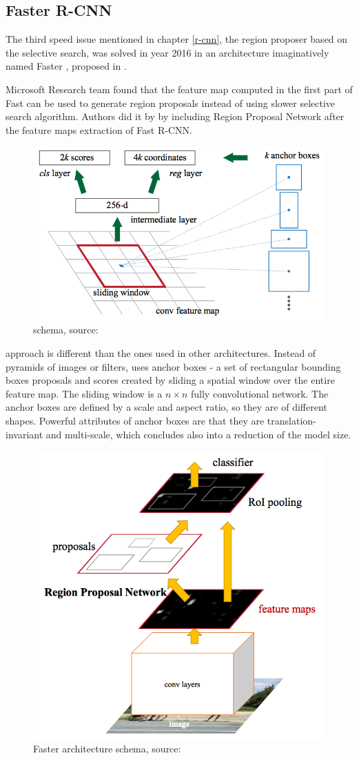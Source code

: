\subsection{Faster R-CNN}
\label{faster-rcnn}

The third speed issue mentioned in chapter \ref{r-cnn}, the region proposer based on the selective search, was solved in year 2016 in an architecture imaginatively named Faster , proposed in \cite{faster-rcnn}.

Microsoft Research team found that the feature map computed in the first part of Fast  can be used to generate region proposals instead of using slower selective search algorithm. Authors did it by by including Region Proposal Network  after the feature maps extraction of Fast R-CNN.

\begin{figure}[H]
   \centering
	\includegraphics[width=.5\linewidth]{./pictures/fasterrcnn-anchors.png}
	\caption[Region proposal network]{ schema, source: \cite{faster-rcnn}}
      \label{fig:rpn}
\end{figure}

 approach is different than the ones used in other architectures. Instead of pyramids of images or filters,  uses anchor boxes - a set of rectangular bounding boxes proposals and scores created by sliding a spatial window over the entire feature map. The sliding window is a $n \times n$ fully convolutional network. The anchor boxes are defined by a scale and aspect ratio, so they are of different shapes. Powerful attributes of anchor boxes are that they are translation-invariant and multi-scale, which concludes also into a reduction of the model size.

\begin{figure}[H]
   \centering
	\includegraphics[width=.55\linewidth]{./pictures/fasterrcnn.png}
	\caption[Faster R-CNN architecture]{Faster  architecture schema, source: \cite{faster-rcnn}}
      \label{fig:faster-rcnn}
\end{figure}

